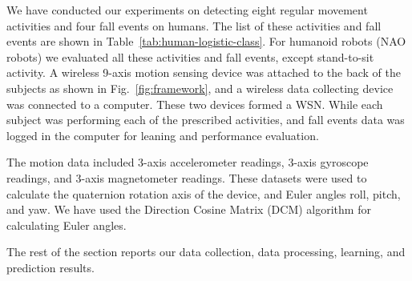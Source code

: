 \documentclass{IEEEtran}
\begin{document}
We have conducted our experiments on detecting eight regular movement activities and four fall events on 
humans. The list of these activities and fall events are shown in Table~\ref{tab:human-logistic-class}. For humanoid robots (NAO robots) we evaluated all these activities and fall events, except stand-to-sit activity. 
 A wireless 9-axis  motion sensing device was attached to the back of the subjects as shown in Fig.~\ref{fig:framework}, and a wireless data collecting device was connected to a computer. These two devices formed a WSN. While each subject was performing each of the prescribed activities, and fall events data was logged in the computer for leaning and performance evaluation.
\par
The motion data included 3-axis accelerometer readings, 3-axis gyroscope readings, and 3-axis magnetometer readings. These datasets were used to calculate
the quaternion rotation axis of the device, and Euler angles roll, pitch, and yaw. We have used the Direction Cosine Matrix (DCM) algorithm for calculating Euler angles. 
\par
The rest of the  section reports our data collection, data processing, learning, 
and prediction results.


\end{document}
